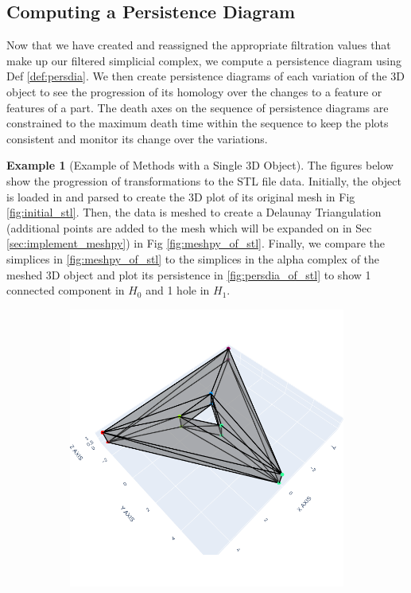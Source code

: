 \documentclass[ma]{uncgdissertationexp}
\theoremstyle{plain}
\theoremstyle{definition}
\newtheorem{example}[theorem]{Example}
\theoremstyle{remark}
\begin{document}
\subsection{Computing a Persistence Diagram}
\label{sec:compute_persdia}
\par Now that we have created and reassigned the appropriate filtration values that make up our filtered simplicial complex, we compute a persistence diagram using Def \ref{def:persdia}. We then create persistence diagrams of each variation of the 3D object to see the progression of its homology over the changes to a feature or features of a part. The death axes on the sequence of persistence diagrams are constrained to the maximum death time within the sequence to keep the plots consistent and monitor its change over the variations.

\begin{example}[Example of Methods with a Single 3D Object]
\par The figures below show the progression of transformations to the STL file data. Initially, the object is loaded in and parsed to create the 3D plot of its original mesh in Fig \ref{fig:initial_stl}. Then, the data is meshed to create a Delaunay Triangulation (additional points are added to the mesh which will be expanded on in Sec \ref{sec:implement_meshpy}) in Fig \ref{fig:meshpy_of_stl}. Finally, we compare the simplices in \ref{fig:meshpy_of_stl} to the simplices in the alpha complex of the meshed 3D object and plot its persistence in \ref{fig:persdia_of_stl} to show 1 connected component in $H_{0}$ and 1 hole in $H_{1}$.
\begin{figure}[H]
    \centering
    \begin{subfigure}[b]{0.3\textwidth}
        \centering
        \includegraphics[width=\textwidth]{Final Run, (triangular prism - triangle hole) plotly screenshot.png}

\end{subfigure}
\end{figure}
\end{example}
\end{document}
